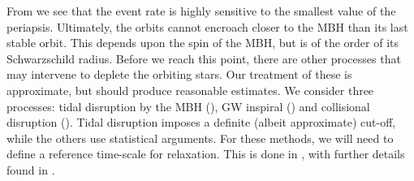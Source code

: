 From  we see that the event rate is highly sensitive to the smallest value of the periapsis. Ultimately, the orbits cannot encroach closer to the MBH than its last stable orbit. This depends upon the spin of the MBH, but is of the order of its Schwarzschild radius. Before we reach this point, there are other processes that may intervene to deplete the orbiting stars. Our treatment of these is approximate, but should produce reasonable estimates. We consider three processes: tidal disruption by the MBH (), GW inspiral () and collisional disruption (). Tidal disruption imposes a definite (albeit approximate) cut-off, while the others use statistical arguments. For these methods, we will need to define a reference time-scale for relaxation. This is done in , with further details found in .

